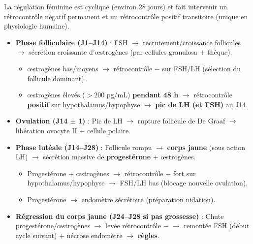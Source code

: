 \documentclass[11pt]{article}
\newcommand{\cle}[1]{{\popxbold\color{popdark}#1}}
\begin{document}
\begin{propriete}
La régulation féminine est cyclique (environ 28 jours) et fait intervenir un \cle{rétrocontrôle négatif} permanent et un \cle{rétrocontrôle positif} transitoire (unique en physiologie humaine).
\begin{itemize}
\item \textbf{Phase folliculaire (J1--J14)} : FSH $\rightarrow$ recrutement/croissance follicules $\rightarrow$ sécrétion croissante d'\oe{}strogènes (par cellules granulosa + thèque).
\begin{itemize}
\item \oe{}strogènes bas/moyens $\rightarrow$ rétrocontrôle $-$ sur FSH/LH (sélection du follicule dominant).
\item \oe{}strogènes élevés ($> 200$ pg/mL) \textbf{pendant 48 h} $\rightarrow$ rétrocontrôle \textbf{positif} sur hypothalamus/hypophyse $\rightarrow$ \textbf{pic de LH (et FSH)} au J14.
\end{itemize}
\item \textbf{Ovulation (J14 $\pm$ 1)} : Pic de LH $\rightarrow$ rupture follicule de De Graaf $\rightarrow$ libération ovocyte II + cellule polaire.
\item \textbf{Phase lutéale (J14--J28)} : Follicule rompu $\rightarrow$ \textbf{corps jaune} (sous action LH) $\rightarrow$ sécrétion massive de \textbf{progestérone} + \oe{}strogènes.
\begin{itemize}
\item Progestérone + \oe{}strogènes $\rightarrow$ rétrocontrôle $-$ fort sur hypothalamus/hypophyse $\rightarrow$ FSH/LH bas (blocage nouvelle ovulation).
\item Progestérone $\rightarrow$ endomètre sécrétoire (préparation nidation).
\end{itemize}
\item \textbf{Régression du corps jaune (J24--J28 si pas grossesse)} : Chute progestérone/\oe{}strogènes $\rightarrow$ levée rétrocontrôle $-$ $\rightarrow$ remontée FSH (début cycle suivant) + nécrose endomètre $\rightarrow$ \textbf{règles}.
\end{itemize}
\end{propriete}
\end{document}
